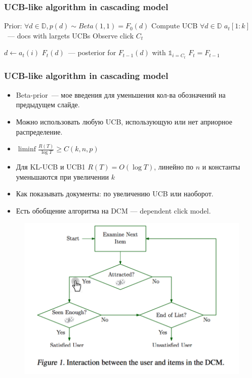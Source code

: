 \documentclass[xetex,mathserif,serif,table]{beamer}
\begin{document}
\begin{frame}
\frametitle{UCB-like algorithm in cascading model}

\begin{algorithmic}
 \State Prior: $\forall d \in \mathbb{D}, p(d) \sim Beta(1, 1) = F_0(d)$
    \State Compute UCB $\forall d \in \mathbb{D}$
    \State $a_t[1:k]$ — docs with largets UCBs
    \State Observe click $C_t$ 

      \State $d \gets a_t(i)$
      \State $F_{t}(d)$ — posterior for $F_{t-1}(d)$ with $\mathbb{1}_{i = C_t}$
    \EndFor
      \State $F_{t} = F_{t-1}$
    \EndFor
  \EndFor 
\end{algorithmic}
\end{frame}
\begin{frame}
\frametitle{UCB-like algorithm in cascading model}
\begin{itemize}
\item Beta-prior — мое введения для уменьшения кол-ва обозначений на предыдущем слайде.
\item Можно использовать любую UCB, использующую или нет априорное распределение. 
\item $\liminf \frac{R(T)}{\log T} \geq C(k, n, p) $
\item Для KL-UCB и UCB1 $R(T) = O(\log T)$, линейно по $n$ и константы уменьшаются при увеличении $k$
\item Как показывать документы: по увеличению UCB или наоборот. 
\item Есть обобщение алгоритма на DCM — dependent click model.
\end{itemize}
\end{frame}

\begin{frame}

\begin{figure}
  \centering
     \includegraphics[width=0.7\paperwidth]{img/dcm.png}
\end{figure}
\end{frame}
\end{document}
